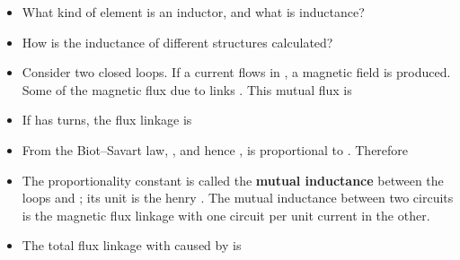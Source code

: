 \begin{ELunit}


\begin{itemize}
\tightlist
\item
  What kind of element is an inductor, and what is inductance?
\item
  How is the inductance of different structures calculated?
\end{itemize}


\begin{itemize}
\tightlist
\item
  Consider two closed loops. If a current  flows in , a magnetic field  is produced. Some of the magnetic flux due to  links . This mutual flux is
\end{itemize}


\begin{itemize}
\tightlist
\item
  If  has  turns, the flux linkage is
\end{itemize}


\begin{itemize}
\tightlist
\item
  From the Biot--Savart law, , and hence , is proportional to . Therefore
\end{itemize}


\begin{itemize}
\tightlist
\item
  The proportionality constant  is called the \textbf{mutual inductance} between the loops  and ; its unit is the henry . The mutual inductance between two circuits is the magnetic flux linkage with one circuit per unit current in the other.
\item
  The total flux linkage with  caused by  is
\end{itemize}


\end{ELunit}
